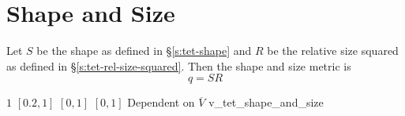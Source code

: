 \section{Shape and Size\label{s:tet-shape-and-size}}

Let $S$ be the shape as defined in \S\ref{s:tet-shape}
and $R$ be the relative size squared as defined in \S\ref{s:tet-rel-size-squared}.
Then the shape and size metric is
\begin{displaymath}
q = S R
\end{displaymath}

%
{$1$}%
{$[0.2,1]$}%
{$[0,1]$}%
{$[0,1]$}%
{Dependent on $\overline{V}$}%
{\cite{knu:03}}%
{v\_tet\_shape\_and\_size}%


